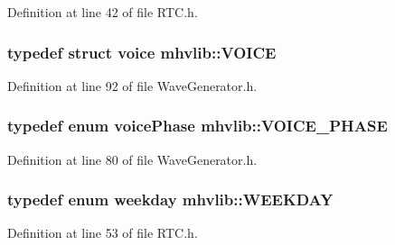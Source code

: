 Definition at line 42 of file R\-T\-C.\-h.

\hypertarget{namespacemhvlib_a30dd69204107a88716243d57489dc5bc}{
\subsubsection[{V\-O\-I\-C\-E}]{\setlength{\rightskip}{0pt plus 5cm}typedef struct {\bf voice} {\bf mhvlib\-::\-V\-O\-I\-C\-E}}}\label{namespacemhvlib_a30dd69204107a88716243d57489dc5bc}


Definition at line 92 of file Wave\-Generator.\-h.

\hypertarget{namespacemhvlib_aa0be04640f7d224bfc226bca5561dd80}{
\subsubsection[{V\-O\-I\-C\-E\-\_\-\-P\-H\-A\-S\-E}]{\setlength{\rightskip}{0pt plus 5cm}typedef enum {\bf voice\-Phase} {\bf mhvlib\-::\-V\-O\-I\-C\-E\-\_\-\-P\-H\-A\-S\-E}}}\label{namespacemhvlib_aa0be04640f7d224bfc226bca5561dd80}


Definition at line 80 of file Wave\-Generator.\-h.

\hypertarget{namespacemhvlib_ade7995baadfb86fecbbbe6f8d624db9c}{
\subsubsection[{W\-E\-E\-K\-D\-A\-Y}]{\setlength{\rightskip}{0pt plus 5cm}typedef enum {\bf weekday} {\bf mhvlib\-::\-W\-E\-E\-K\-D\-A\-Y}}}\label{namespacemhvlib_ade7995baadfb86fecbbbe6f8d624db9c}


Definition at line 53 of file R\-T\-C.\-h.



